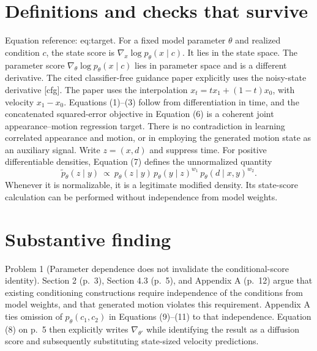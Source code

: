 \documentclass[10pt]{article}
\begin{document}
\section*{Definitions and checks that survive}
Equation reference: eq:target. For a fixed model parameter \(\theta\) and realized condition \(c\), the state score is \(\nabla_x\log p_\theta(x\mid c)\). It lies in the state space. The parameter score \(\nabla_\theta\log p_\theta(x\mid c)\) lies in parameter space and is a different derivative. The cited classifier-free guidance paper explicitly uses the noisy-state derivative [cfg]. The paper uses the interpolation \(x_t=t x_1+(1-t)x_0\), with velocity \(x_1-x_0\). Equations (1)–(3) follow from differentiation in time, and the concatenated squared-error objective in Equation (6) is a coherent joint appearance–motion regression target. There is no contradiction in learning correlated appearance and motion, or in employing the generated motion state as an auxiliary signal. Write \(z=(x,d)\) and suppress time. For positive differentiable densities, Equation (7) defines the unnormalized quantity \[
\widetilde p_\theta(z\mid y)\ \propto\
p_\theta(z\mid y)\,p_\theta(y\mid z)^{w_1}\,
p_\theta(d\mid x,y)^{w_2}.\] Whenever it is normalizable, it is a legitimate modified density. Its state-score calculation can be performed without independence from model weights.\par
\section*{Substantive finding}
Problem 1 (Parameter dependence does not invalidate the conditional-score identity).  Section 2 (p. 3), Section 4.3 (p. 5), and Appendix A (p. 12) argue that existing conditioning constructions require independence of the conditions from model weights, and that generated motion violates this requirement. Appendix A ties omission of \(p_\theta(c_1,c_2)\) in Equations (9)–(11) to that independence. Equation (8) on p. 5 then explicitly writes \(\nabla_{\theta'}\) while identifying the result as a diffusion score and subsequently substituting state-sized velocity predictions.\par
\end{document}
